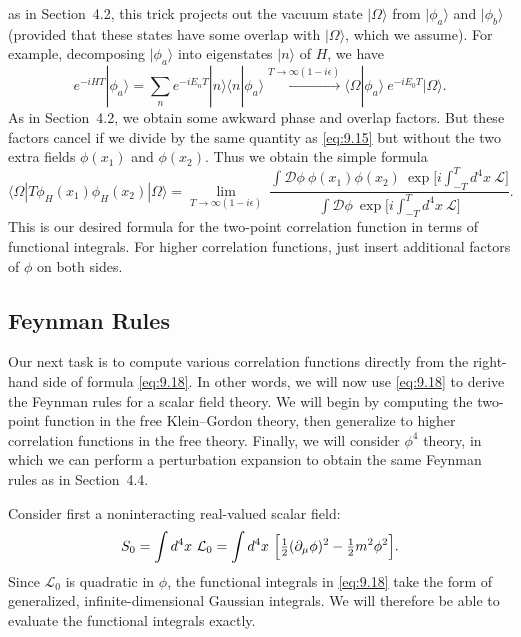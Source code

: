 as in Section~4.2, this trick projects out the vacuum state $|\Omega\rangle$
from $|\phi_a\rangle$ and $|\phi_b\rangle$ (provided that these states have
some overlap with $|\Omega\rangle$, which we assume).  For example, decomposing
$|\phi_a\rangle$ into eigenstates $|n\rangle$ of $H$, we have
\begin{equation}
  e^{-iHT}|\phi_a\rangle = \sum_n e^{-iE_nT}|n\rangle\langle n|\phi_a\rangle
  \xrightarrow{T\to\infty(1-i\epsilon)}
    \langle\Omega|\phi_a\rangle\ e^{-iE_0T}|\Omega\rangle .
\end{equation}
As in Section~4.2, we obtain some awkward phase and overlap factors.  But
these factors cancel if we divide by the same quantity as \eqref{eq:9.15} but
without the two extra fields $\phi(x_1)$ and $\phi(x_2)$.  Thus we obtain the
simple formula
\begin{equation}
  \langle\Omega|T\phi_H(x_1)\phi_H(x_2)|\Omega\rangle
  = \lim_{T\to\infty(1-i\epsilon)}\
    \frac{\int\mathcal{D}\phi\ \phi(x_1)\phi(x_2)\ \exp\bigl[
      i\int_{-T}^{T}d^4x\ \mathcal{L} \bigr]}
      {\int\mathcal{D}\phi\ \exp\bigl[ i\int_{-T}^{T}d^4x\ \mathcal{L} \bigr]} .
  \label{eq:9.18}
\end{equation}
This is our desired formula for the two-point correlation function in terms of
functional integrals.  For higher correlation functions, just insert additional
factors of $\phi$ on both sides.

\subsection{Feynman Rules}

Our next task is to compute various correlation functions directly from the
right-hand side of formula \eqref{eq:9.18}.  In other words, we will now use
\eqref{eq:9.18} to derive the Feynman rules for a scalar field theory.  We
will begin by computing the two-point function in the free Klein--Gordon
theory, then generalize to higher correlation functions in the free theory.
Finally, we will consider $\phi^4$ theory, in which we can perform a
perturbation expansion to obtain the same Feynman rules as in Section~4.4.

Consider first a noninteracting real-valued scalar field:
\begin{equation}
  S_0 = \int d^4x\ \mathcal{L}_0
  = \int d^4x\ \Bigl[ \tfrac{1}{2}(\partial_\mu\phi)^2
    - \tfrac{1}{2}m^2\phi^2 \Bigr].
  \label{eq:9.19}
\end{equation}
Since $\mathcal{L}_0$ is quadratic in $\phi$, the functional integrals in
\eqref{eq:9.18} take the form of generalized, infinite-dimensional Gaussian
integrals.  We will therefore be able to evaluate the functional integrals
exactly.

